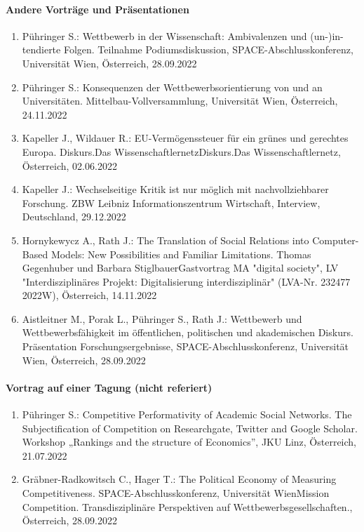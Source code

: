\paragraph{Andere Vorträge und Präsentationen}
\begin{enumerate}
	\item Pühringer S.: Wettbewerb in der Wissenschaft: Ambivalenzen und (un-)in-tendierte Folgen. Teilnahme Podiumsdiskussion, SPACE-Abschlusskonferenz, Universität Wien, Österreich, 28.09.2022
	\item Pühringer S.: Konsequenzen der Wettbewerbsorientierung von und an Universitäten. Mittelbau-Vollversammlung, Universität Wien, Österreich, 24.11.2022
	\item Kapeller J., Wildauer R.: EU-Vermögenssteuer für ein grünes und gerechtes Europa. Diskurs.Das WissenschaftlernetzDiskurs.Das Wissenschaftlernetz, Österreich, 02.06.2022
	\item Kapeller J.: Wechselseitige Kritik ist nur möglich mit nachvollziehbarer Forschung. ZBW Leibniz Informationszentrum Wirtschaft, Interview, Deutschland, 29.12.2022
	\item Hornykewycz A., Rath J.: The Translation of Social Relations into Computer-Based Models: New Possibilities and Familiar Limitations. Thomas Gegenhuber und Barbara StiglbauerGastvortrag MA "digital society", LV "Interdisziplinäres Projekt: Digitalisierung interdisziplinär" (LVA-Nr. 232477 2022W), Österreich, 14.11.2022
	\item Aistleitner M., Porak L., Pühringer S., Rath J.: Wettbewerb und Wettbewerbsfähigkeit im öffentlichen, politischen und akademischen Diskurs. Präsentation Forschungsergebnisse, SPACE-Abschlusskonferenz, Universität Wien, Österreich, 28.09.2022
\end{enumerate}
\paragraph{Vortrag auf einer Tagung (nicht referiert)}
\begin{enumerate}
	\item Pühringer S.: Competitive Performativity of Academic Social Networks. The Subjectification of Competition on Researchgate, Twitter and Google Scholar. Workshop „Rankings and the structure of Economics”, JKU Linz, Österreich, 21.07.2022
	\item Gräbner-Radkowitsch C., Hager T.: The Political Economy of Measuring Competitiveness. SPACE-Abschlusskonferenz, Universität WienMission Competition. Transdisziplinäre Perspektiven auf Wettbewerbsgesellschaften., Österreich, 28.09.2022
\end{enumerate}
